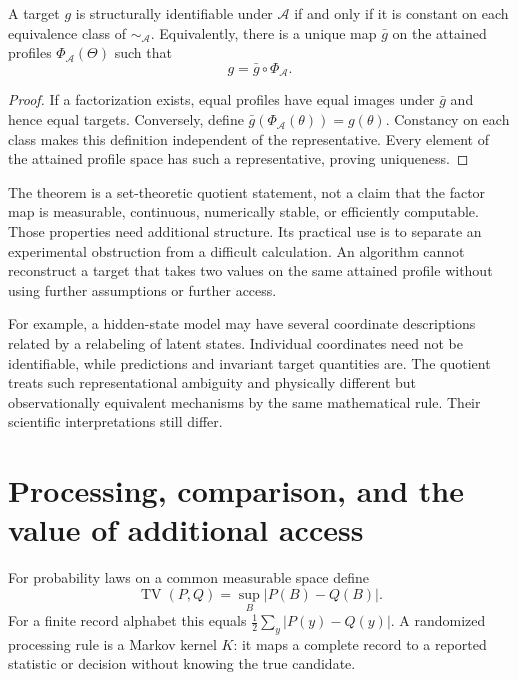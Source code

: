 \begin{theorem}\label{foundations:factorization}
A target $g$ is structurally identifiable under $\mathcal A$ if and only if
it is constant on each equivalence class of $\sim_{\mathcal A}$. Equivalently,
there is a unique map $\bar g$ on the attained profiles
$\Phi_{\mathcal A}(\Theta)$ such that
\begin{equation}
 g=\bar g\circ\Phi_{\mathcal A}.
\end{equation}
\end{theorem}
\begin{proof}
If a factorization exists, equal profiles have equal images under
$\bar g$ and hence equal targets. Conversely, define
$\bar g(\Phi_{\mathcal A}(\theta))=g(\theta)$. Constancy on each class
makes this definition independent of the representative. Every element
of the attained profile space has such a representative, proving uniqueness.
\end{proof}

The theorem is a set-theoretic quotient statement, not a claim that the
factor map is measurable, continuous, numerically stable, or efficiently
computable. Those properties need additional structure. Its practical use
is to separate an experimental obstruction from a difficult calculation.
An algorithm cannot reconstruct a target that takes two values on the
same attained profile without using further assumptions or further access.

For example, a hidden-state model may have several coordinate descriptions
related by a relabeling of latent states. Individual coordinates need not be
identifiable, while predictions and invariant target quantities are. The
quotient treats such representational ambiguity and physically different
but observationally equivalent mechanisms by the same mathematical rule.
Their scientific interpretations still differ.

\section{Processing, comparison, and the value of additional access}

For probability laws on a common measurable space define
\begin{equation}
 \operatorname{TV}(P,Q)=\sup_B|P(B)-Q(B)|.
\end{equation}
For a finite record alphabet this equals
$\frac12\sum_y|P(y)-Q(y)|$. A randomized processing rule is a Markov
kernel $K$: it maps a complete record to a reported statistic or decision
without knowing the true candidate.

